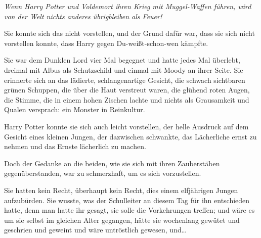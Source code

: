 \emph{Wenn Harry Potter und Voldemort ihren Krieg mit Muggel-Waffen führen, wird von der Welt nichts anderes übrigbleiben als Feuer!}

Sie konnte sich das nicht vorstellen, und der Grund dafür war, dass sie sich nicht vorstellen konnte, dass Harry gegen Du-weißt-schon-wen kämpfte.

Sie war dem Dunklen Lord vier Mal begegnet und hatte jedes Mal überlebt, dreimal mit Albus als Schutzschild und einmal mit Moody an ihrer Seite. Sie erinnerte sich an das lädierte, schlangenartige Gesicht, die schwach sichtbaren grünen Schuppen, die über die Haut verstreut waren, die glühend roten Augen, die Stimme, die in einem hohen Zischen lachte und nichts als Grausamkeit und Qualen versprach: ein Monster in Reinkultur.

Harry Potter konnte sie sich auch leicht vorstellen, der helle Ausdruck auf dem Gesicht eines kleinen Jungen, der dazwischen schwankte, das Lächerliche ernst zu nehmen und das Ernste lächerlich zu machen.

Doch der Gedanke an die beiden, wie sie sich mit ihren Zauberstäben gegenüberstanden, war zu schmerzhaft, um es sich vorzustellen.

Sie hatten kein Recht, überhaupt kein Recht, dies einem elfjährigen Jungen aufzubürden. Sie wusste, was der Schulleiter an diesem Tag für ihn entschieden hatte, denn man hatte ihr gesagt, sie solle die Vorkehrungen treffen; und wäre es um sie selbst im gleichen Alter gegangen, hätte sie wochenlang gewütet und geschrien und geweint und wäre untröstlich gewesen, und…

